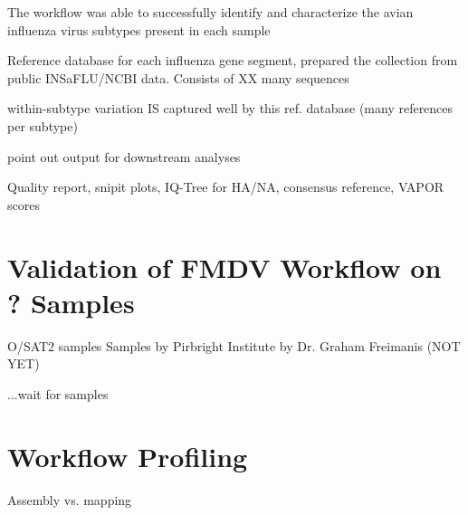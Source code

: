 The workflow was able to successfully identify and characterize the avian influenza virus subtypes present in each sample

\todoit
Reference database for each influenza gene segment, prepared the collection from public INSaFLU/NCBI data. Consists of XX many sequences

within-subtype variation IS captured well by this ref. database (many references per subtype)



point out output for downstream analyses 

Quality report, snipit plots, IQ-Tree for \ac{HA}/\ac{NA}, consensus reference, VAPOR scores

\section{Validation of FMDV Workflow on ? Samples}
O/SAT2 samples
\todoit
Samples by Pirbright Institute by Dr. Graham Freimanis (NOT YET)

...wait for samples

\section{Workflow Profiling}
\todoit
Assembly vs. mapping
 
